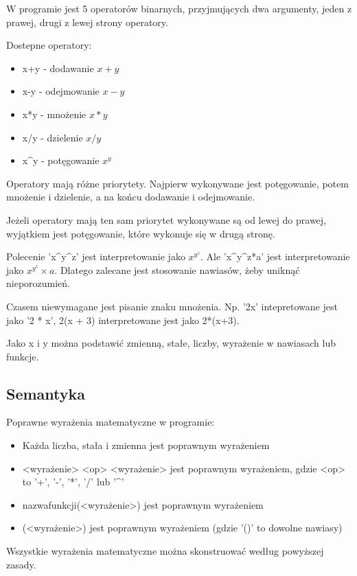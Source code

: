 \documentclass[a4paper]{article}
\begin{document}
W programie jest 5 operatorów binarnych, przyjmujących dwa argumenty, jeden z prawej, drugi z lewej strony operatory. 

Dostepne operatory:
\begin{itemize}
    \item x+y - dodawanie $x+y$
    \item x-y - odejmowanie $x-y$
    \item x*y - mnożenie $x*y$
    \item x/y - dzielenie $x/y$
    \item x\^{}y - potęgowanie $x^y$ 
\end{itemize}

Operatory mają różne priorytety. Najpierw wykonywane jest potęgowanie, potem mnożenie i dzielenie, a na końcu dodawanie i odejmowanie.

Jeżeli operatory mają ten sam priorytet wykonywane są od lewej do prawej, wyjątkiem jest potęgowanie, które wykonuje się w drugą stronę.

Polecenie 'x\^{}y\^{}z' jest interpretowanie jako $x^{y^z}$. 
Ale 'x\^{}y\^{}z*a' jest interpretowanie jako $x^{y^z} \times a$. Dlatego zalecane jest stosowanie nawiasów, żeby uniknąć nieporozumień.

Czasem niewymagane jest pisanie znaku mnożenia. Np. '2x' intepretowane jest jako '2 * x', 2(x + 3) interpretowane jest jako 2*(x+3).

Jako x i y można podstawić zmienną, stałe, liczby, wyrażenie w nawiasach lub funkcje.

\subsection{Semantyka}

Poprawne wyrażenia matematyczne w programie:
\begin{itemize}
    \item Każda liczba, stała i zmienna jest poprawnym wyrażeniem
    \item <wyrażenie> <op> <wyrażenie> jest poprawnym wyrażeniem, gdzie <op> to '+', '-', '*', '/' lub '\^{}'
    \item nazwafunkcji(<wyrażenie>) jest poprawnym wyrażeniem
    \item (<wyrażenie>) jest poprawnym wyrażeniem (gdzie '()' to dowolne nawiasy)
\end{itemize}

Wszystkie wyrażenia matematyczne można skonstruować według powyższej zasady.
\end{document}
